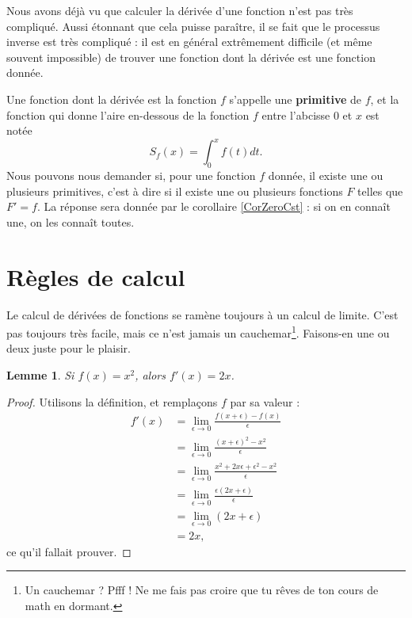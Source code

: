 \documentclass[a4paper,12pt]{book}
\newcounter{numtho}
\theoremstyle{mes_exemples}	\newtheorem{exemple}[numtho]{Exemple}
\theoremstyle{mes_tho}
\newtheorem{lemma}[numtho]{Lemme}
\newcommand{\defe}[2]{\textbf{#1}\index{#2}}
\begin{document}
Nous avons déjà vu que calculer la dérivée d'une fonction n'est pas très compliqué. Aussi étonnant que cela puisse paraître, il se fait que le processus inverse est très compliqué : il est en général extrêmement difficile (et même souvent impossible) de trouver une fonction dont la dérivée est une fonction donnée.

Une fonction dont la dérivée est la fonction $f$ s'appelle une \defe{primitive}{Primitive} de $f$, et la fonction qui donne l'aire en-dessous de la fonction $f$ entre l'abcisse $0$ et $x$ est notée
\begin{equation}
	S_f(x)=\int_0^xf(t)dt.
\end{equation}
Nous pouvons nous demander si, pour une fonction $f$ donnée, il existe une ou plusieurs primitives, c'est à dire si il existe une ou plusieurs fonctions $F$ telles que $F'=f$. La réponse sera donnée par le corollaire \ref{CorZeroCst} : si on en connaît une, on les connaît toutes. 

					\section{Règles de calcul}

Le calcul de dérivées de fonctions se ramène toujours à un calcul de limite. C'est pas toujours très facile, mais ce n'est jamais un cauchemar\footnote{Un cauchemar ? Pfff ! Ne me fais pas croire que tu rêves de ton cours de math en dormant.}. Faisons-en une ou deux juste pour le plaisir.

\begin{lemma}			\label{LemDeccCarr}
	Si $f(x)=x^2$, alors $f'(x)=2x$.
\end{lemma}

\begin{proof}
	Utilisons la définition, et remplaçons $f$ par sa valeur :
	\begin{subequations}
		\begin{align}
			f'(x)	&=\lim_{\epsilon\to 0}\frac{ f(x+\epsilon)-f(x) }{ \epsilon }\\
				&=\lim_{\epsilon\to 0}\frac{ (x+\epsilon)^2-x^2 }{ \epsilon }\\
				&=\lim_{\epsilon\to 0}\frac{ x^2+2x\epsilon+\epsilon^2-x^2 }{ \epsilon }\\
				&=\lim_{\epsilon\to 0}\frac{\epsilon(2x+\epsilon)}{ \epsilon }\\
				&=\lim_{\epsilon\to 0}(2x+\epsilon)\\
				&=2x,
		\end{align}
	\end{subequations}
	ce qu'il fallait prouver.
\end{proof}
\end{document}
